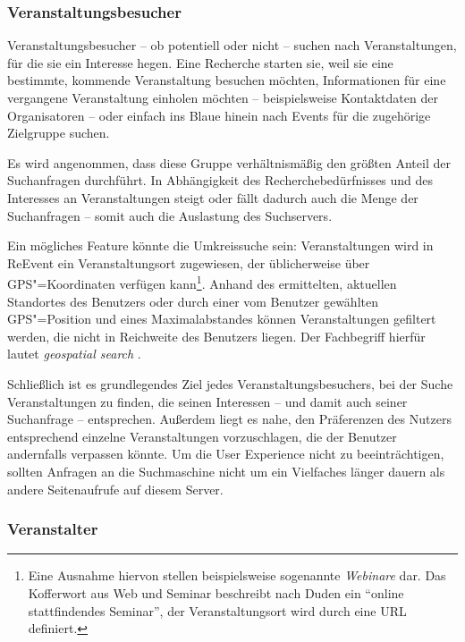 \subsubsection{Veranstaltungsbesucher}

Veranstaltungsbesucher -- ob potentiell oder nicht -- suchen nach Veranstaltungen, für die sie ein Interesse hegen. Eine Recherche starten sie, weil sie eine bestimmte, kommende Veranstaltung besuchen möchten, Informationen für eine vergangene Veranstaltung einholen möchten -- beispielsweise Kontaktdaten der Organisatoren -- oder einfach ins Blaue hinein nach Events für die zugehörige Zielgruppe suchen.

Es wird angenommen, dass diese Gruppe verhältnismäßig den größten Anteil der Suchanfragen durchführt. In Abhängigkeit des Recherchebedürfnisses und des Interesses an Veranstaltungen steigt oder fällt dadurch auch die Menge der Suchanfragen -- somit auch die Auslastung des Suchservers.

Ein mögliches Feature könnte die Umkreissuche sein: Veranstaltungen wird in ReEvent ein Veranstaltungsort zugewiesen, der üblicherweise über GPS"=Koordinaten verfügen kann\footnote{Eine Ausnahme hiervon stellen beispielsweise sogenannte \emph{Webinare} dar. Das Kofferwort aus Web und Seminar beschreibt nach Duden ein \enquote{online stattfindendes Seminar}, der Veranstaltungsort wird durch eine URL definiert.}. Anhand des ermittelten, aktuellen Standortes des Benutzers oder durch einer vom Benutzer gewählten GPS"=Position und eines Maximalabstandes können Veranstaltungen gefiltert werden, die nicht in Reichweite des Benutzers liegen. Der Fachbegriff hierfür lautet \emph{geospatial search} \cite[S. 521]{Grainger.2014}.

Schließlich ist es grundlegendes Ziel jedes Veranstaltungsbesuchers, bei der Suche Veranstaltungen zu finden, die seinen Interessen -- und damit auch seiner Suchanfrage -- entsprechen. Außerdem liegt es nahe, den Präferenzen des Nutzers entsprechend einzelne Veranstaltungen vorzuschlagen, die der Benutzer andernfalls verpassen könnte. Um die User Experience nicht zu beeinträchtigen, sollten Anfragen an die Suchmaschine nicht um ein Vielfaches länger dauern als andere Seitenaufrufe auf diesem Server.

\subsubsection{Veranstalter}

